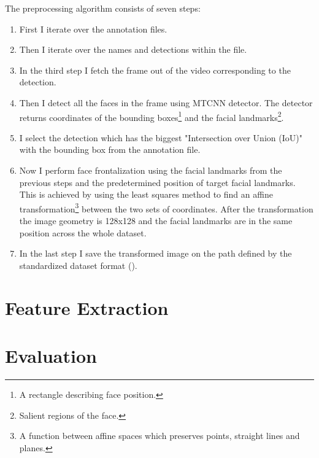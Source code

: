 The preprocessing algorithm consists of seven steps:
\begin{enumerate}
    \item First I iterate over the annotation files.
    \item Then I iterate over the names and detections within the file.
    \item In the third step I fetch the frame out of the video corresponding to the detection.
    \item Then I detect all the faces in the frame using MTCNN detector.
    The detector returns coordinates of the bounding boxes\footnote{A rectangle describing face position.} and the
    facial landmarks\footnote{Salient regions of the face.}.
    \item I select the detection which has the biggest "Intersection over Union (IoU)" with the bounding box from the
    annotation file.
    \item Now I perform face frontalization using the facial landmarks from the previous steps and the predetermined
    position of target facial landmarks.
    This is achieved by using the least squares method to find an affine transformation\footnote{A function between
    affine spaces which preserves points, straight lines and planes.} between the two sets of coordinates.
    After the transformation the image geometry is 128x128 and the facial landmarks are in the same position across
    the whole dataset.
    \item In the last step I save the transformed image on the path defined by the standardized dataset format
    ().
\end{enumerate}

\section{Feature Extraction}\label{sec:feature-extraction}

\section{Evaluation}\label{sec:evaluation}

